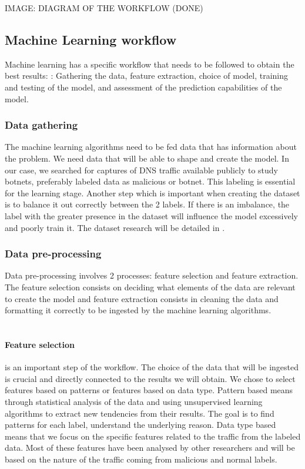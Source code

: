 IMAGE: DIAGRAM OF THE WORKFLOW (DONE)

\subsection{Machine Learning workflow}
Machine learning has a specific workflow that needs to be followed to obtain the best results: \cite{ml-workflow}: Gathering the data, feature extraction, choice of model, training and testing of the model, and assessment of the prediction capabilities of the model.

\subsubsection{Data gathering} The machine learning algorithms need to be fed data that has information about the problem. We need data that will be able to shape and create the model. In our case, we searched for captures of DNS traffic available publicly to study botnets, preferably labeled data as malicious or botnet. This labeling is essential for the learning stage. Another step which is important when creating the dataset is to balance it out correctly between the 2 labels. If there is an imbalance, the label with the greater presence in the dataset will influence the model excessively and poorly train it. The dataset research will be detailed in \label{datasetchapter}.

\subsubsection{Data pre-processing} 
Data pre-processing involves 2 processes: feature selection and feature extraction. The feature selection consists on deciding what elements of the data are relevant to create the model and feature extraction consists in cleaning the data and formatting it correctly to be ingested by the machine learning algorithms.\\\\

\paragraph{Feature selection} is an important step of the workflow. The choice of the data that will be ingested is crucial and directly connected to the results we will obtain. We chose to select features based on patterns or features based on data type. Pattern based means through statistical analysis of the data and using unsupervised learning algorithms to extract new tendencies from their results. The goal is to find patterns for each label, understand the underlying reason. Data type based means that we focus on the  specific features related to the traffic from the labeled data. Most of these features have been analysed by other researchers and will be based on the nature of the traffic coming from malicious and normal labels.\label{featureselectionlabel}

